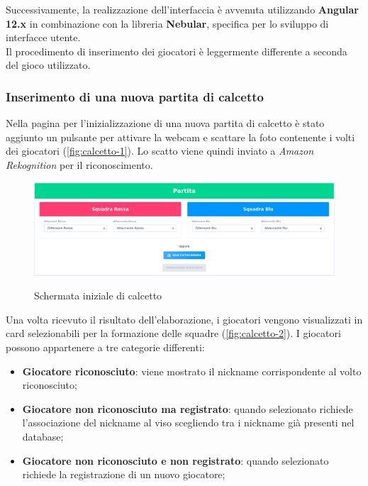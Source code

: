 	\noindent Successivamente, la realizzazione dell'interfaccia è avvenuta utilizzando \textbf{Angular 12.x} in combinazione con la libreria 
	\textbf{Nebular}, specifica per lo sviluppo di interfacce utente. \\
	Il procedimento di inserimento dei giocatori è leggermente differente a seconda del gioco utilizzato.
	
		\subsubsection{Inserimento di una nuova partita di calcetto}
		Nella pagina per l'inizializzazione di una nuova partita di calcetto è stato aggiunto un pulsante per attivare la webcam e scattare la foto  contenente i volti dei giocatori (\autoref{fig:calcetto-1}). Lo scatto viene quindi inviato a \emph{Amazon Rekognition} per il riconoscimento. 
		
		\begin{figure}[H]
			\centering
			\includegraphics[width=\textwidth]{immagini/calcetto-1.png} \\
			\caption{\label{fig:calcetto-1} Schermata iniziale di calcetto}
		\end{figure}
	
		\noindent Una volta ricevuto il risultato dell'elaborazione, i giocatori vengono visualizzati in card selezionabili per la formazione delle squadre (\autoref{fig:calcetto-2}). I giocatori possono appartenere a tre categorie differenti:
		\begin{itemize}
			\item \textbf{Giocatore riconosciuto}: viene mostrato il nickname corrispondente al volto riconosciuto;
			\item \textbf{Giocatore non riconosciuto ma registrato}: quando selezionato richiede l'associazione del nickname al viso scegliendo tra i nickname già presenti nel database; 
			\item\textbf{Giocatore non riconosciuto e non registrato}: quando selezionato richiede la registrazione di un nuovo giocatore; 
		\end{itemize}
	
